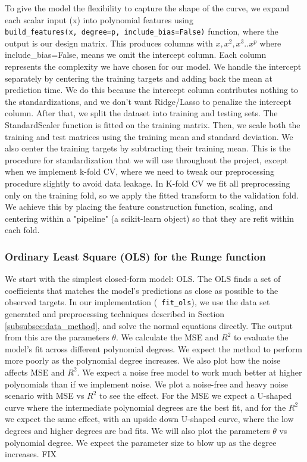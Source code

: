 \documentclass[amssymb,twocolumn,aps]{revtex4-2}
\begin{document}
To give the model the flexibility to capture the shape of the curve, we expand each scalar input (x) into polynomial features using \texttt{build\_features(x,\ degree=p,\ include\_bias=False)} function, where the output is our design matrix. This produces columns with $x, x^2, x^3 .. x^p$ where include\_bias=False, means we omit the intercept column. Each column represents the complexity we have chosen for our model. We handle the intercept separately by centering the training targets and adding back the mean at prediction time. We do this because the intercept column contributes nothing to the standardizations, and we don't want Ridge/Lasso to penalize the intercept column. After that, we split the dataset into training and testing sets. The StandardScaler function is fitted on the training matrix. Then, we scale both the training and test matrices using the training mean and standard deviation. We also center the training targets by subtracting their training mean. This is the procedure for standardization that we will use throughout the project, except when we implement k-fold CV, where we need to tweak our preprocessing procedure slightly to avoid data leakage. In K-fold CV we fit all preprocessing only on the training fold, so we apply the fitted transform to the validation fold. We achieve this by placing the feature construction function, scaling, and centering within a "pipeline" (a scikit-learn object) so that they are refit within each fold. \\

\subsubsection{Ordinary Least Square (OLS) for the Runge function}
 \label{subsubsec:ols_method}

We start with the simplest closed-form model: OLS. The OLS finds a set of coefficients that matches the model's predictions as close as possible to the observed targets. In our implementation (\texttt{ fit\_ols}), we use the data set generated and preprocessing techniques described in Section \ref{subsubsec:data_method}, and solve the normal equations directly. The output from this are the parameters $\theta$. We calculate the MSE and $R^2$ to evaluate the model's fit across different polynomial degrees. We expect the method to perform more poorly as the polynomial degree increases. We also plot how the noise affects MSE and $R^2$. We expect a noise free model to work much better at higher polynomials than if we implement noise. We plot a noise-free and heavy noise scenario with MSE vs $R^2$ to see the effect. For the MSE we expect a U-shaped curve where the intermediate polynomial degrees are the best fit, and for the $R^2$ we expect the same effect, with an upside down U-shaped curve, where the low degrees and higher degrees are bad fits. We will also plot the parameters $\theta$ vs polynomial degree. We expect the parameter size to blow up as the degree increases. FIX \\
\end{document}
